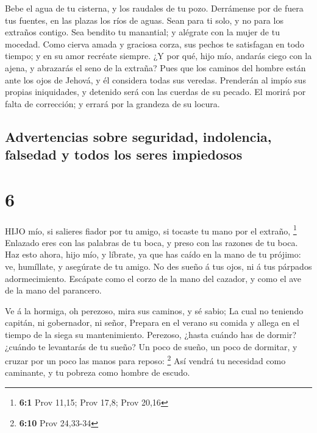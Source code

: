  Bebe el agua de tu cisterna, y los raudales de tu pozo.
 Derrámense por de fuera tus fuentes, en las plazas los
ríos de aguas.  Sean para ti solo, y no para los extraños
contigo.  Sea bendito tu manantial; y alégrate con la mujer
de tu mocedad.  Como cierva amada y graciosa corza, sus
pechos te satisfagan en todo tiempo; y en su amor recréate siempre.
 ¿Y por qué, hijo mío, andarás ciego con la ajena, y
abrazarás el seno de la extraña?  Pues que los caminos del
hombre están ante los ojos de Jehová, y él considera todas sus veredas.
 Prenderán al impío sus propias iniquidades, y detenido
será con las cuerdas de su pecado.  El morirá por falta de
corrección; y errará por la grandeza de su locura.

\hypertarget{advertencias-sobre-seguridad-indolencia-falsedad-y-todos-los-seres-impiedosos}{%
\subsection{Advertencias sobre seguridad, indolencia, falsedad y todos
los seres
impiedosos}\label{advertencias-sobre-seguridad-indolencia-falsedad-y-todos-los-seres-impiedosos}}

\hypertarget{section-5}{%
\section{6}\label{section-5}}

 HIJO mío, si salieres fiador por tu amigo, si tocaste tu
mano por el extraño, \footnote{\textbf{6:1} Prov 11,15; Prov 17,8; Prov
  20,16}  Enlazado eres con las palabras de tu boca, y preso
con las razones de tu boca.  Haz esto ahora, hijo mío, y
líbrate, ya que has caído en la mano de tu prójimo: ve, humíllate, y
asegúrate de tu amigo.  No des sueño á tus ojos, ni á tus
párpados adormecimiento.  Escápate como el corzo de la mano
del cazador, y como el ave de la mano del parancero.

 Ve á la hormiga, oh perezoso, mira sus caminos, y sé sabio;
 La cual no teniendo capitán, ni gobernador, ni señor,
 Prepara en el verano su comida y allega en el tiempo de la
siega su mantenimiento.  Perezoso, ¿hasta cuándo has de
dormir? ¿cuándo te levantarás de tu sueño?  Un poco de
sueño, un poco de dormitar, y cruzar por un poco las manos para reposo:
\footnote{\textbf{6:10} Prov 24,33-34}  Así vendrá tu
necesidad como caminante, y tu pobreza como hombre de escudo.

